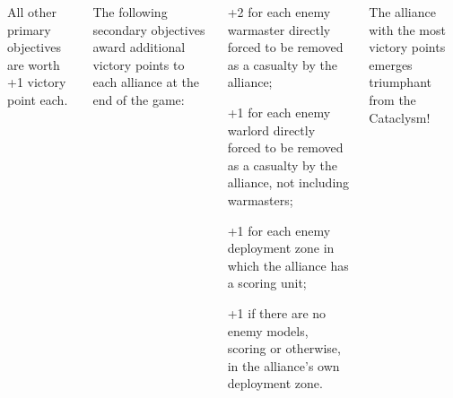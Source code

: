 \documentclass{40k}
\begin{document}
\begin{columns}
\begin{squishitemize}
  \item All other primary objectives are worth +1 victory point each.
  \end{squishitemize}

    The following secondary
  objectives award additional victory points to each alliance at the
  end of the game:
  \begin{squishitemize}
  \item +2 for each enemy warmaster directly forced to be removed as a
    casualty by the alliance;

  \item +1 for each enemy warlord directly forced to be removed as a
    casualty by the alliance, not including warmasters;

  \item +1 for each enemy deployment zone in which the alliance has a
    scoring unit;

  \item +1 if there are no enemy models, scoring or otherwise, in the
    alliance's own deployment zone.
  \end{squishitemize}

  \bigskip%
  The alliance with the most victory points emerges triumphant from
  the Cataclysm!

\end{columns}

\bigskip
\divider
\end{document}
